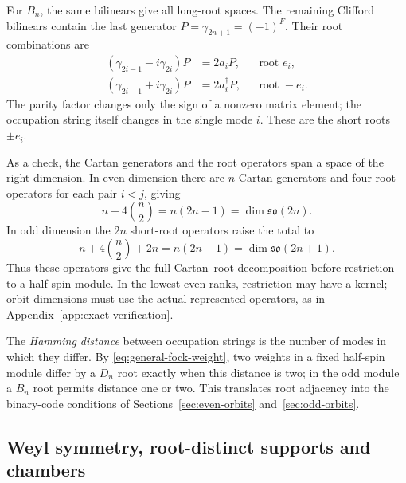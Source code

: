 \documentclass{article}
\theoremstyle{definition}
\theoremstyle{remark}
\begin{document}
For $B_n$, the same bilinears give all long-root spaces.  The remaining
Clifford bilinears contain the last generator
$P=\gamma_{2n+1}=(-1)^F$.  Their root combinations are
\begin{align}
 (\gamma_{2i-1}-i\gamma_{2i})P
 &=2a_iP,
 &&\text{root }e_i,\label{eq:Bn-positive-short-root}\\
 (\gamma_{2i-1}+i\gamma_{2i})P
 &=2a_i^\dagger P,
 &&\text{root }-e_i.
 \label{eq:Bn-negative-short-root}
\end{align}
The parity factor changes only the sign of a nonzero matrix element; the
occupation string itself changes in the single mode $i$.  These are the
short roots $\pm e_i$.

As a check, the Cartan generators and the root operators span a space of the right dimension.
In even dimension there are $n$ Cartan generators and four root operators for
each pair $i<j$, giving
\begin{equation*}
 n+4\binom n2=n(2n-1)=\dim\mathfrak{so}(2n).
\end{equation*}
In odd dimension the $2n$ short-root operators raise the total to
\begin{equation*}
 n+4\binom n2+2n=n(2n+1)=\dim\mathfrak{so}(2n+1).
\end{equation*}
Thus these operators give the full Cartan--root decomposition before
restriction to a half-spin module. In the lowest even ranks, restriction
may have a kernel; orbit dimensions must use the actual represented
operators, as in Appendix~\ref{app:exact-verification}.

The \emph{Hamming distance} between occupation strings is the number of
modes in which they differ. By \eqref{eq:general-fock-weight}, two weights
in a fixed half-spin module differ by a $D_n$ root exactly when this
distance is two; in the odd module a $B_n$ root permits distance one or
two. This translates root adjacency into the binary-code conditions of
Sections~\ref{sec:even-orbits} and~\ref{sec:odd-orbits}.


\subsection{Weyl symmetry, root-distinct supports and chambers}
\label{sec:weyl-root-distinct}
\end{document}
